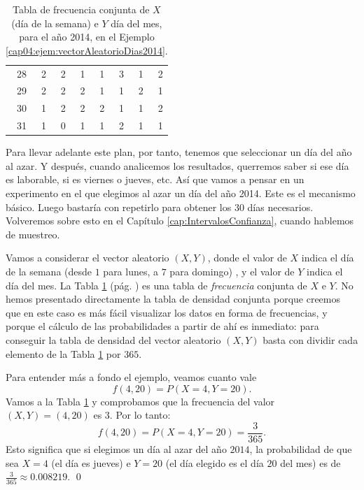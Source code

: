 \begin{ejemplo}
\begin{table}[p]
\begin{tabular}{|r|r|r|r|r|r|r|r|}
  28 &   2 &   2 &   1 &   1 &   3 &   1 &   2 \\
  29 &   2 &   2 &   2 &   1 &   1 &   2 &   1 \\
  30 &   1 &   2 &   2 &   2 &   1 &   1 &   2 \\
  31 &   1 &   0 &   1 &   1 &   2 &   1 &   1 \\
   \hline
\end{tabular}
\caption{Tabla de frecuencia conjunta de $X$ (día de la semana) e $Y$ día del mes, para el año 2014, en el Ejemplo \ref{cap04:ejem:vectorAleatorioDias2014}.}
\label{cap04:tabla:vectorAleatorioDias2014}
\end{table}

Para llevar adelante este plan, por tanto, tenemos que seleccionar un día del año al azar. Y después, cuando analicemos los resultados, querremos saber si ese día es laborable, si es viernes o jueves, etc.  Así que vamos a pensar en un experimento en el que elegimos al azar un día del año 2014. Este es el mecanismo básico. Luego bastaría con repetirlo para obtener los 30 días necesarios. Volveremos sobre esto en el Capítulo \ref{cap:IntervalosConfianza}, cuando hablemos de muestreo.

Vamos a considerar el vector aleatorio $(X,Y)$, donde el valor de $X$ indica el día de la semana (desde $1$ para lunes, a $7$ para domingo) , y el valor de $Y$ indica el día del mes. La Tabla \ref{cap04:tabla:vectorAleatorioDias2014} (pág. \pageref{cap04:tabla:vectorAleatorioDias2014}) es una tabla de {\em frecuencia} conjunta de $X$ e $Y$.  No hemos presentado directamente la tabla de densidad conjunta porque creemos que en este caso es más fácil visualizar los datos en forma de frecuencias, y porque el cálculo  de las probabilidades a partir de ahí es inmediato: para conseguir la tabla de densidad del vector aleatorio $(X,Y)$ basta con dividir cada elemento de la Tabla \ref{cap04:tabla:vectorAleatorioDias2014} por $365$.



Para entender más a fondo el ejemplo, veamos cuanto vale
\[f(4, 20) = P(X=4, Y=20).\]
Vamos a la Tabla \ref{cap04:tabla:vectorAleatorioDias2014} y comprobamos que la frecuencia del valor $(X,Y)=(4,20)$ es $3$. Por lo tanto:
\[f(4, 20) = P(X=4, Y=20)=\dfrac{3}{365}.\]
Esto significa que si elegimos un día al azar  del año $2014$, la probabilidad de que sea $X=4$ (el día es jueves) e $Y=20$ (el día elegido es el día $20$ del mes) es de $\frac{3}{365}\approx 0.008219$.
\qed
\end{ejemplo}


